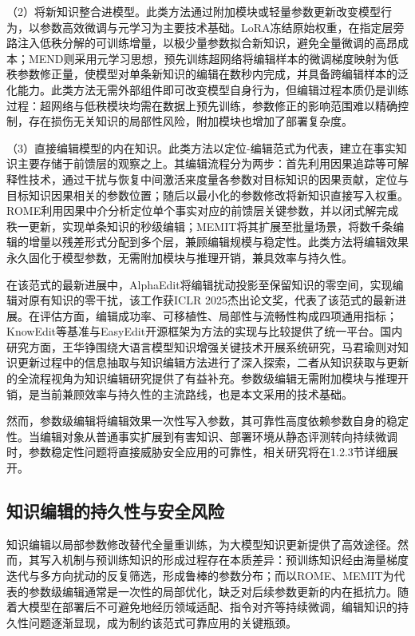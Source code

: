 （2）将新知识整合进模型。此类方法通过附加模块或轻量参数更新改变模型行为，以参数高效微调\cite{hu2022lora}与元学习为主要技术基础。LoRA冻结原始权重，在指定层旁路注入低秩分解的可训练增量，以极少量参数拟合新知识，避免全量微调的高昂成本；MEND\cite{mitchell2022mend}则采用元学习思想，预先训练超网络将编辑样本的微调梯度映射为低秩参数修正量，使模型对单条新知识的编辑在数秒内完成，并具备跨编辑样本的泛化能力。此类方法无需外部组件即可改变模型自身行为，但编辑过程本质仍是训练过程：超网络与低秩模块均需在数据上预先训练，参数修正的影响范围难以精确控制，存在损伤无关知识的局部性风险，附加模块也增加了部署复杂度。

（3）直接编辑模型的内在知识。此类方法以定位-编辑范式为代表，建立在事实知识主要存储于前馈层的观察之上。其编辑流程分为两步：首先利用因果追踪等可解释性技术，通过干扰与恢复中间激活来度量各参数对目标知识的因果贡献，定位与目标知识因果相关的参数位置；随后以最小化的参数修改将新知识直接写入权重。ROME\cite{meng2022rome}利用因果中介分析定位单个事实对应的前馈层关键参数，并以闭式解完成秩一更新，实现单条知识的秒级编辑；MEMIT\cite{meng2023memit}将其扩展至批量场景，将数千条编辑的增量以残差形式分配到多个层，兼顾编辑规模与稳定性。此类方法将编辑效果永久固化于模型参数，无需附加模块与推理开销，兼具效率与持久性。

在该范式的最新进展中，AlphaEdit\cite{fang2024alphaedit}将编辑扰动投影至保留知识的零空间，实现编辑对原有知识的零干扰，该工作获ICLR 2025杰出论文奖，代表了该范式的最新进展。在评估方面，编辑成功率、可移植性、局部性与流畅性构成四项通用指标\cite{zhang2024comprehensive}；KnowEdit等基准与EasyEdit\cite{wang2024easyedit}开源框架为方法的实现与比较提供了统一平台。国内研究方面，王华铮\cite{wanghuazheng2026}围绕大语言模型知识增强关键技术开展系统研究，马君瑜\cite{majunyu2026}则对知识更新过程中的信息抽取与知识编辑方法进行了深入探索，二者从知识获取与更新的全流程视角为知识编辑研究提供了有益补充。参数级编辑无需附加模块与推理开销，是当前兼顾效率与持久性的主流路线，也是本文采用的技术基础。

然而，参数级编辑将编辑效果一次性写入参数，其可靠性高度依赖参数自身的稳定性。当编辑对象从普通事实扩展到有害知识、部署环境从静态评测转向持续微调时，参数稳定性问题将直接威胁安全应用的可靠性，相关研究将在1.2.3节详细展开。

\subsection{知识编辑的持久性与安全风险}

知识编辑以局部参数修改替代全量重训练，为大模型知识更新提供了高效途径\cite{zhang2024comprehensive}。然而，其写入机制与预训练知识的形成过程存在本质差异：预训练知识经由海量梯度迭代与多方向扰动的反复筛选，形成鲁棒的参数分布；而以ROME\cite{meng2022rome}、MEMIT\cite{meng2023memit}为代表的参数级编辑通常是一次性的局部优化，缺乏对后续参数更新的内在抵抗力。随着大模型在部署后不可避免地经历领域适配、指令对齐等持续微调，编辑知识的持久性问题逐渐显现，成为制约该范式可靠应用的关键瓶颈。

